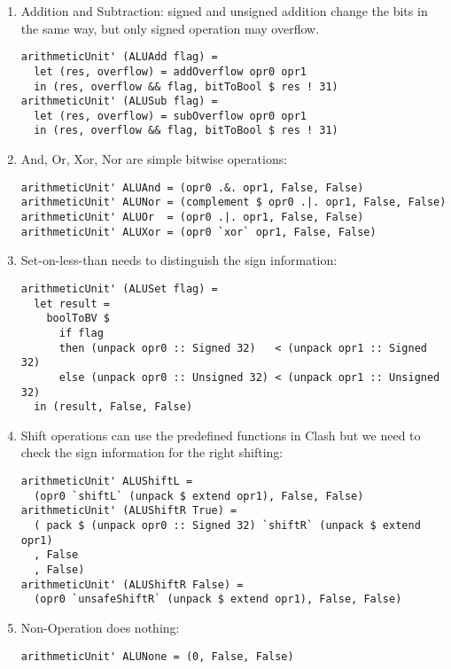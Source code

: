\begin{enumerate}
	\item Addition and Subtraction: signed and unsigned addition change the bits in the same way, but only signed operation may overflow. 
	\begin{verbatim}
arithmeticUnit' (ALUAdd flag) =
  let (res, overflow) = addOverflow opr0 opr1
  in (res, overflow && flag, bitToBool $ res ! 31)
arithmeticUnit' (ALUSub flag) =
  let (res, overflow) = subOverflow opr0 opr1
  in (res, overflow && flag, bitToBool $ res ! 31)
	\end{verbatim}
	\item And, Or, Xor, Nor are simple bitwise operations:
	\begin{verbatim}
arithmeticUnit' ALUAnd = (opr0 .&. opr1, False, False)
arithmeticUnit' ALUNor = (complement $ opr0 .|. opr1, False, False)
arithmeticUnit' ALUOr  = (opr0 .|. opr1, False, False)
arithmeticUnit' ALUXor = (opr0 `xor` opr1, False, False) 
	\end{verbatim}
	\item Set-on-less-than needs to distinguish the sign information:
    \begin{verbatim}
arithmeticUnit' (ALUSet flag) =
  let result =
    boolToBV $
      if flag
      then (unpack opr0 :: Signed 32)   < (unpack opr1 :: Signed 32)
      else (unpack opr0 :: Unsigned 32) < (unpack opr1 :: Unsigned 32)
  in (result, False, False)
\end{verbatim}
\item Shift operations can use the predefined functions in Clash but we need to check the sign information for the right shifting:
\begin{verbatim}
arithmeticUnit' ALUShiftL =
  (opr0 `shiftL` (unpack $ extend opr1), False, False)
arithmeticUnit' (ALUShiftR True) =
  ( pack $ (unpack opr0 :: Signed 32) `shiftR` (unpack $ extend opr1)
  , False
  , False)
arithmeticUnit' (ALUShiftR False) =
  (opr0 `unsafeShiftR` (unpack $ extend opr1), False, False)
\end{verbatim}
\item Non-Operation does nothing:
\begin{verbatim}
arithmeticUnit' ALUNone = (0, False, False)
\end{verbatim}
\end{enumerate}

